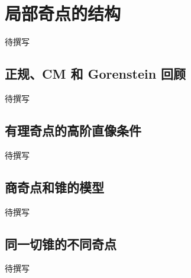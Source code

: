 
% 
% 

\section{局部奇点的结构}
\label{g5:sec:2901}

待撰写

\subsection{正规、CM 和 Gorenstein 回顾}
\label{g5:subsec:2901:01}
待撰写

\subsection{有理奇点的高阶直像条件}
\label{g5:subsec:2901:02}
待撰写

\subsection{商奇点和锥的模型}
\label{g5:subsec:2901:03}
待撰写

\subsection{同一切锥的不同奇点}
\label{g5:subsec:2901:04}
待撰写
